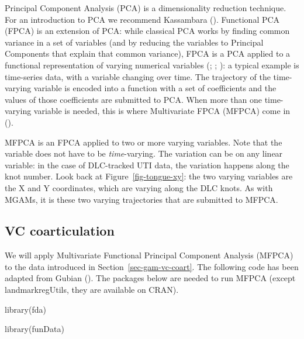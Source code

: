 \documentclass[
  man,
  longtable,
  nolmodern,
  notxfonts,
  notimes,
  colorlinks=true,linkcolor=blue,citecolor=blue,urlcolor=blue]{apa7}
\newenvironment{Shaded}{\begin{snugshade}}{\end{snugshade}}
\newcommand{\FunctionTok}[1]{\textcolor[rgb]{0.28,0.35,0.67}{#1}}
\newcommand{\NormalTok}[1]{\textcolor[rgb]{0.00,0.23,0.31}{#1}}
\begin{document}
Principal Component Analysis (PCA) is a dimensionality reduction
technique. For an introduction to PCA we recommend Kassambara
(). Functional PCA (FPCA) is an
extension of PCA: while classical PCA works by finding common variance
in a set of variables (and by reducing the variables to Principal
Components that explain that common variance), FPCA is a PCA applied to
a functional representation of varying numerical variables
(;
;
): a typical example is
time-series data, with a variable changing over time. The trajectory of
the time-varying variable is encoded into a function with a set of
coefficients and the values of those coefficients are submitted to PCA.
When more than one time-varying variable is needed, this is where
Multivariate FPCA (MFPCA) come in ().

MFPCA is an FPCA applied to two or more varying variables. Note that the
variable does not have to be \emph{time}-varying. The variation can be
on any linear variable: in the case of DLC-tracked UTI data, the
variation happens along the knot number. Look back at
Figure~\ref{fig-tongue-xy}: the two varying variables are the X and Y
coordinates, which are varying along the DLC knots. As with MGAMs, it is
these two varying trajectories that are submitted to MFPCA.

\subsection{VC coarticulation}\label{sec-fpca-vc}

We will apply Multivariate Functional Principal Component Analysis
(MFPCA) to the data introduced in Section~\ref{sec-gam-vc-coart}. The
following code has been adapted from Gubian
(). The packages below are needed to run
MFPCA (except landmarkregUtils, they are available on CRAN).

\begin{Shaded}
\begin{Highlighting}[]
\FunctionTok{library}\NormalTok{(fda)}
\end{Highlighting}
\end{Shaded}

\begin{Shaded}
\begin{Highlighting}[]
\FunctionTok{library}\NormalTok{(funData)}
\end{Highlighting}
\end{Shaded}
\end{document}
